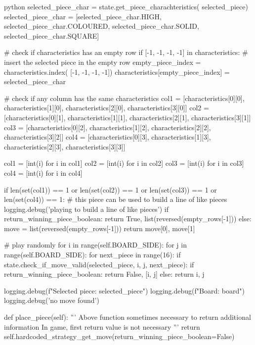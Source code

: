 \begin{mintedbox}{python}
            selected_piece_char = state.get_piece_charachteristics(
                selected_piece)
            selected_piece_char = [selected_piece_char.HIGH, selected_piece_char.COLOURED,
                                    selected_piece_char.SOLID, selected_piece_char.SQUARE]

            # check if characteristics has an empty row
            if [-1, -1, -1, -1] in characteristics:
                # insert the selected piece in the empty row
                empty_piece_index = characteristics.index(
                    [-1, -1, -1, -1])
                characteristics[empty_piece_index] = selected_piece_char

                # check if any column has the same characteristics
                col1 = [characteristics[0][0], characteristics[1][0],
                        characteristics[2][0], characteristics[3][0]]
                col2 = [characteristics[0][1], characteristics[1][1],
                        characteristics[2][1], characteristics[3][1]]
                col3 = [characteristics[0][2], characteristics[1][2],
                        characteristics[2][2], characteristics[3][2]]
                col4 = [characteristics[0][3], characteristics[1][3],
                        characteristics[2][3], characteristics[3][3]]

                col1 = [int(i) for i in col1]
                col2 = [int(i) for i in col2]
                col3 = [int(i) for i in col3]
                col4 = [int(i) for i in col4]

                if len(set(col1)) == 1 or len(set(col2)) == 1 or len(set(col3)) == 1 or len(set(col4)) == 1:
                    # this piece can be used to build a line of like pieces
                    logging.debug('playing to build a line of like pieces')
                    if return_winning_piece_boolean:
                        return True, list(reversed(empty_rows[-1]))
                    else:
                        move = list(reversed(empty_rows[-1]))
                        return move[0], move[1]

        # play randomly
        for i in range(self.BOARD_SIDE):
            for j in range(self.BOARD_SIDE):
                for next_piece in range(16):
                    if state.check_if_move_valid(selected_piece, i, j, next_piece):
                        if return_winning_piece_boolean:
                            return False, [i, j]
                        else:
                            return i, j

        logging.debug(f"Selected piece: {selected_piece}")
        logging.debug(f"Board: {board}")
        logging.debug('no move found')

    def place_piece(self):
        '''
        Above function sometimes necessary to return additional information
        In game, first return value is not necessary
        '''
        return self.hardcoded_strategy_get_move(return_winning_piece_boolean=False)
\end{mintedbox}

